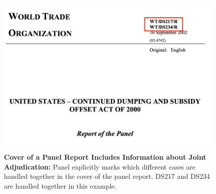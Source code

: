 \begin{figure}[h]
  \centering
  \includegraphics[scale=0.35]{Data/pngs/linked_cases.png}
  \caption{\textbf{Cover of a Panel Report Includes Information about Joint Adjudication:}
      Panel explicitly marks which different cases are handled together in the cover of the panel report. DS217 and DS234 are handled together in this example.
      }
  \label{fig:linked-cases}
\end{figure}
 
 
 

